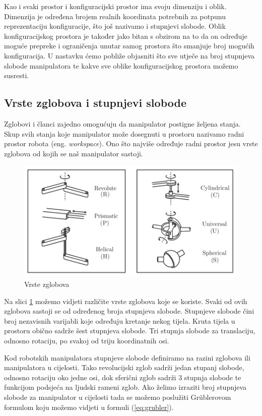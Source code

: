 \documentclass[times, utf8, diplomskirad]{fer}
\begin{document}
Kao i svaki prostor i konfiguracijski prostor ima svoju dimenziju i oblik.
Dimenzija je određena brojem realnih koordinata potrebnih za potpunu reprezentaciju konfiguracije, što još nazivamo i stupnjevi slobode.
Oblik konfiguracijskog prostora je također jako bitan s obzirom na to da on određuje moguće prepreke i ograničenja unutar samog prostora što smanjuje broj mogućih konfiguracija.
U nastavku ćemo pobliže objasniti što sve utječe na broj stupnjeva slobode manipulatora te kakve sve oblike konfiguracijskog prostora možemo susresti.

\hfill
\subsection{Vrste zglobova i stupnjevi slobode}
Zglobovi i članci zajedno omogućuju da manipulator postigne željena stanja.
Skup svih stanja koje manipulator može dosegnuti u prostoru nazivamo radni prostor robota (eng. \textit{workspace}).
Ono što najviše određuje radni prostor jesu vrste zglobova od kojih se naš manipulator sastoji.

\begin{figure}[H]
    \centering
    \includegraphics[width=12cm]{img/robot-joints}
    \caption{Vrste zglobova\protect\footnotemark}
    \label{fig:robot-joints}
\end{figure}
Na slici \ref{fig:robot-joints} možemo vidjeti različite vrste zglobova koje se koriste.
Svaki od ovih zglobova sastoji se od određenog broja stupnjeva slobode.
Stupnjeve slobode čini broj nezavisnih varijabli koje određuju kretanje nekog tijela.
Kruta tijela u prostoru obično sadrže šest stupnjeva slobode.
Tri stupnja slobode za translaciju, odnosno rotaciju, po svakoj od triju koordinatnih osi.

Kod robotskih manipulatora stupnjeve slobode definiramo na razini zglobova ili manipulatora u cijelosti.
Tako revolucijski zglob sadrži jedan stupanj slobode, odnosno rotaciju oko jedne osi, dok sferični zglob sadrži 3 stupnja slobode te funkcijom podsjeća na ljudski rameni zglob.
Ako želimo izraziti broj stupnjeva slobode za manipulator u cijelosti tada se možemo poslužiti Grüblerovom formulom koju možemo vidjeti u formuli (\ref{eq:grubler}).
\end{document}
